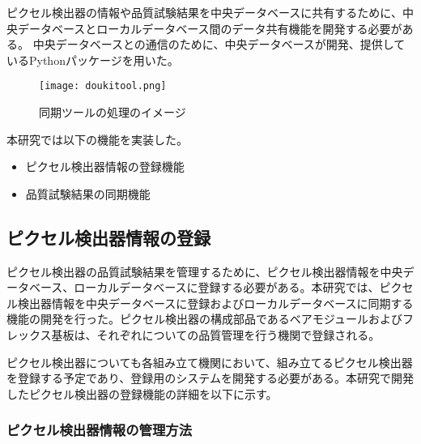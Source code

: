 ピクセル検出器の情報や品質試験結果を中央データベースに共有するために、中央データベースとローカルデータベース間のデータ共有機能を開発する必要がある。
中央データベースとの通信のために、中央データベースが開発、提供しているPythonパッケージを用いた。

\begin{figure}[tbp]
  \centering
  \texttt{[image: doukitool.png]}
  \caption[同期ツールの処理のイメージ]{同期ツールの処理のイメージ}
  \label{fig:doukitool}
\end{figure}


本研究では以下の機能を実装した。
\begin{itemize}
  \item ピクセル検出器情報の登録機能
  \item 品質試験結果の同期機能
\end{itemize}


\subsection{ピクセル検出器情報の登録}
\label{sec:register-module}

ピクセル検出器の品質試験結果を管理するために、ピクセル検出器情報を中央データベース、ローカルデータベースに登録する必要がある。本研究では、ピクセル検出器情報を中央データベースに登録およびローカルデータベースに同期する機能の開発を行った。ピクセル検出器の構成部品であるベアモジュールおよびフレックス基板は、それぞれについての品質管理を行う機関で登録される。

ピクセル検出器についても各組み立て機関において、組み立てるピクセル検出器を登録する予定であり、登録用のシステムを開発する必要がある。本研究で開発したピクセル検出器の登録機能の詳細を以下に示す。


\subsubsection{ピクセル検出器情報の管理方法}
\label{sec:module-parentchild}

